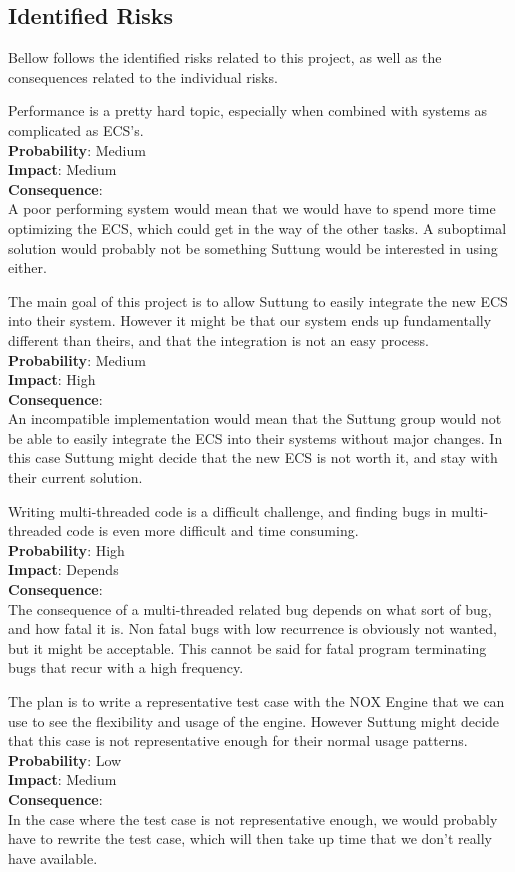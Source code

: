 \subsection{Identified Risks}
Bellow follows the identified risks related to this project, 
as well as the consequences related to the individual risks.

Performance is a pretty hard topic, especially when combined with
systems as complicated as ECS's.\\
\textbf{Probability}: Medium\\
\textbf{Impact}: Medium\\
\textbf{Consequence}:\\
A poor performing system would mean that we would have to spend more time
optimizing the ECS, which could get in the way of the other tasks.
A suboptimal solution would probably not be something Suttung would be interested
in using either.

The main goal of this project is to allow Suttung to easily integrate the new ECS
into their system. 
However it might be that our system ends up fundamentally different than theirs,
and that the integration is not an easy process.\\
\textbf{Probability}: Medium\\
\textbf{Impact}: High\\
\textbf{Consequence}:\\ 
An incompatible implementation would mean that the Suttung group would not be able to
easily integrate the ECS into their systems without major changes. 
In this case Suttung might decide that the new ECS is not worth it,
and stay with their current solution.

Writing multi-threaded code is a difficult challenge, and finding bugs in multi-threaded
code is even more difficult and time consuming.\\
\textbf{Probability}: High\\
\textbf{Impact}: Depends\\
\textbf{Consequence}:\\
The consequence of a multi-threaded related bug depends on what sort of bug, 
and how fatal it is. Non fatal bugs with low recurrence is obviously not wanted,
but it might be acceptable. This cannot be said for fatal program terminating bugs
that recur with a high frequency.

The plan is to write a representative test case with the NOX Engine that we can use
to see the flexibility and usage of the engine. However Suttung might decide that this
case is not representative enough for their normal usage patterns.\\
\textbf{Probability}: Low\\
\textbf{Impact}: Medium\\
\textbf{Consequence}:\\
In the case where the test case is not representative enough, we would probably have to
rewrite the test case, which will then take up time that we don't really have available.

